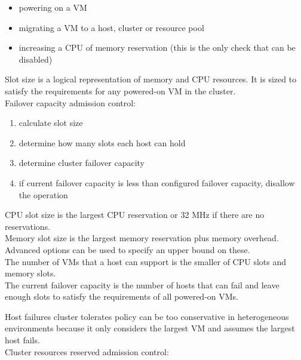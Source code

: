 \begin{itemize}
\item powering on a VM
\item migrating a VM to a host, cluster or resource pool
\item increasing a CPU of memory reservation (this is the only check that can
be disabled)
\end{itemize}

Slot size is a logical representation of memory and CPU resources. It is sized
to satisfy the requirements for any powered-on VM in the cluster.\\

Failover capacity admission control:

\begin{enumerate}
\item calculate slot size
\item determine how many slots each host can hold
\item determine cluster failover capacity
\item if current failover capacity is less than configured failover capacity,
disallow the operation
\end{enumerate}

CPU slot size is the largest CPU reservation or 32 MHz if there are no
reservations.\\

Memory slot size is the largest memory reservation plus memory overhead.\\

Advanced options can be used to specify an upper bound on these.\\

The number of VMs that a host can support is the smaller of CPU slots and
memory slots.\\

The current failover capacity is the number of hosts that can
fail and leave enough slots to satisfy the requirements of all powered-on
VMs.

Host failures cluster tolerates policy can be too conservative in
heterogeneous environments because it only considers the largest VM and assumes
the largest host fails.\\

Cluster resources reserved admission control:

